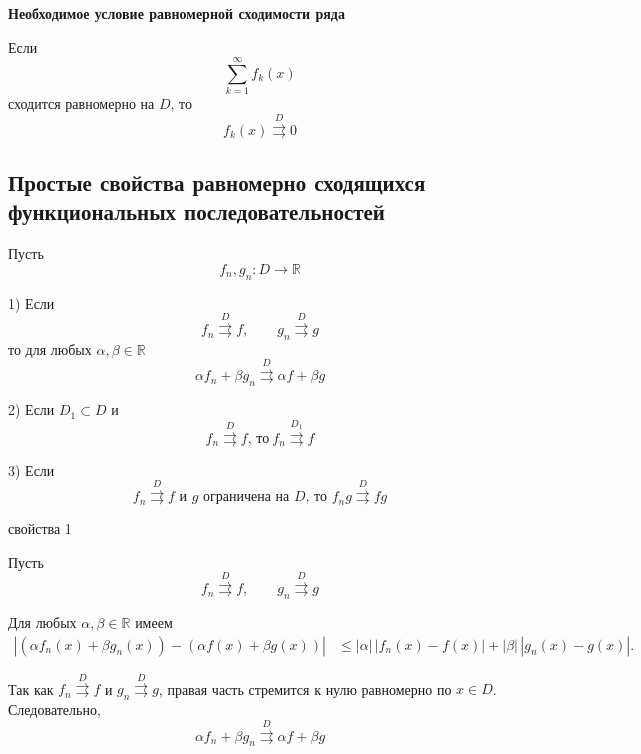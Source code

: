 \documentclass[12pt,a4paper]{article}
\begin{document}
\begin{corollary}

    \textbf{Необходимое условие равномерной сходимости ряда}

    Если
    \[
        \sum_{k=1}^{\infty}f_k(x)
    \]
    сходится равномерно на $D$, то
    \[
        f_k(x)\overset{D}{\rightrightarrows}0
    \]

\end{corollary}

\subsection{Простые свойства равномерно сходящихся функциональных последовательностей}

Пусть
\[
    f_n,g_n\colon D\to\mathbb{R}
\]

\begin{props}

    1) Если
    \[
        f_n\overset{D}{\rightrightarrows}f,
        \qquad
        g_n\overset{D}{\rightrightarrows}g
    \]
    то для любых $\alpha,\beta\in\mathbb{R}$
    \[
        \alpha f_n+\beta g_n\overset{D}{\rightrightarrows}\alpha f+\beta g
    \]

    2) Если $D_1\subset D$ и
    \[
        f_n\overset{D}{\rightrightarrows}f \text{, то}\ f_n\overset{D_1}{\rightrightarrows}f
    \]

    3) Если
    \[
        f_n\overset{D}{\rightrightarrows}f \text{ и } g \text{ ограничена на } D\text{, то } f_ng\overset{D}{\rightrightarrows}fg
    \]

\end{props}

\begin{proofbox}{свойства 1}

    Пусть
    \[
        f_n\overset{D}{\rightrightarrows}f,
        \qquad
        g_n\overset{D}{\rightrightarrows}g
    \]

    Для любых $\alpha,\beta\in\mathbb{R}$ имеем
    \[
        \begin{aligned}
            \left|
            (\alpha f_n(x)+\beta g_n(x))
            -
            (\alpha f(x)+\beta g(x))
            \right|
            &\leq
            |\alpha|\,|f_n(x)-f(x)|
            +
            |\beta|\,|g_n(x)-g(x)|.
        \end{aligned}
    \]

    Так как $f_n\overset{D}{\rightrightarrows}f$ и $g_n\overset{D}{\rightrightarrows}g$, правая часть стремится к нулю равномерно по $x\in D$. Следовательно,
    \[
        \alpha f_n+\beta g_n
        \overset{D}{\rightrightarrows}
        \alpha f+\beta g
    \]

\end{proofbox}
\end{document}
